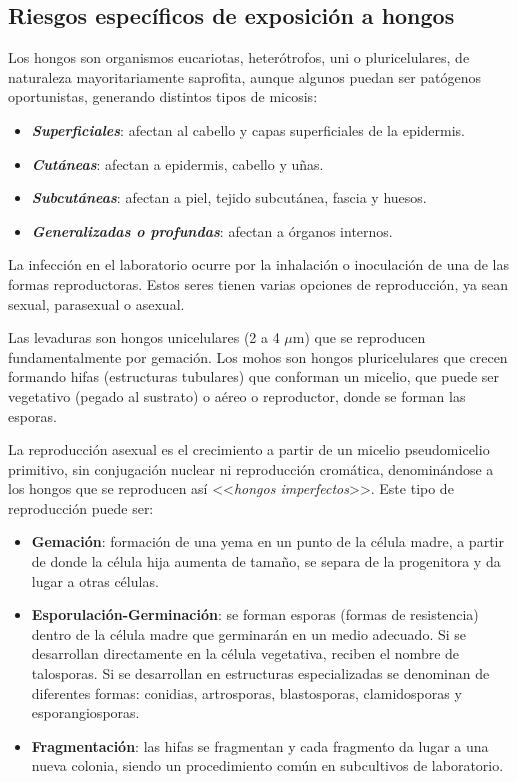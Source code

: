 \subsection{Riesgos específicos de exposición a hongos}
Los hongos son organismos eucariotas, heterótrofos, uni o pluricelulares, de naturaleza mayoritariamente saprofita, aunque algunos puedan ser patógenos oportunistas, generando distintos tipos de micosis:
\begin{itemize}[itemsep=0pt,parsep=0pt,topsep=0pt,partopsep=0pt]
    \item \textit{\textbf{Superficiales}}: afectan al cabello y capas superficiales de la epidermis.
    \item \textit{\textbf{Cutáneas}}: afectan a epidermis, cabello y uñas.
    \item \textit{\textbf{Subcutáneas}}: afectan a piel, tejido subcutánea, fascia y huesos.
    \item \textit{\textbf{Generalizadas o profundas}}: afectan a órganos internos.
\end{itemize}
La infección en el laboratorio ocurre por la inhalación o inoculación de una de las formas reproductoras. Estos seres tienen varias opciones de reproducción, ya sean sexual, parasexual  o asexual.

Las levaduras son hongos unicelulares (2 a 4 $\mu$m) que se reproducen fundamentalmente por gemación. Los mohos son hongos pluricelulares que crecen formando hifas (estructuras tubulares) que conforman un micelio, que puede ser vegetativo (pegado al sustrato) o aéreo o reproductor, donde se forman las esporas.

La reproducción asexual es el crecimiento a partir de un micelio pseudomicelio primitivo, sin conjugación nuclear ni reproducción cromática, denominándose a los hongos que se reproducen así <<\textit{hongos imperfectos}>>. Este tipo de reproducción puede ser:
\begin{itemize}[itemsep=0pt,parsep=0pt,topsep=0pt,partopsep=0pt]
    \item \textbf{Gemación}: formación de una yema en un punto de la célula madre, a partir de donde la célula hija aumenta de tamaño, se separa de la progenitora y da lugar a otras células.
    \item \textbf{Esporulación-Germinación}: se forman esporas (formas de resistencia) dentro de la célula madre que germinarán en un medio adecuado. Si se desarrollan directamente en la célula vegetativa, reciben el nombre de talosporas. Si se desarrollan en estructuras especializadas se denominan de diferentes formas: conidias, artrosporas, blastosporas, clamidosporas y esporangiosporas.
    \item \textbf{Fragmentación}: las hifas se fragmentan y cada fragmento da lugar a una nueva colonia, siendo un procedimiento común en subcultivos de laboratorio.
\end{itemize}

